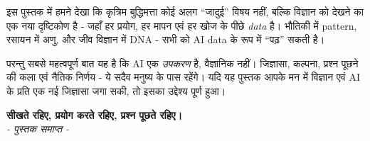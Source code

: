 इस पुस्तक में हमने देखा कि कृत्रिम बुद्धिमत्ता कोई अलग “जादुई” विषय नहीं, बल्कि
विज्ञान को देखने का एक नया दृष्टिकोण है - जहाँ हर प्रयोग, हर मापन एवं हर खोज के पीछे
\emph{data} है। भौतिकी में pattern, रसायन में अणु, और जीव विज्ञान में DNA - सभी को AI
data के रूप में “पढ़” सकती है।

परन्तु सबसे महत्वपूर्ण बात यह है कि AI एक \emph{उपकरण} है, वैज्ञानिक नहीं। जिज्ञासा,
कल्पना, प्रश्न पूछने की कला एवं नैतिक निर्णय - ये सदैव मनुष्य के पास रहेंगे। यदि यह
पुस्तक आपके मन में विज्ञान एवं AI के प्रति एक नई जिज्ञासा जगा सकी, तो इसका उद्देश्य
पूर्ण हुआ।

\begin{center}
\vspace{0.5em}
{\sffamily\bfseries\color{aiblue} सीखते रहिए, प्रयोग करते रहिए, प्रश्न पूछते रहिए।}\\[4pt]
\textit{- पुस्तक समाप्त -}
\end{center}
